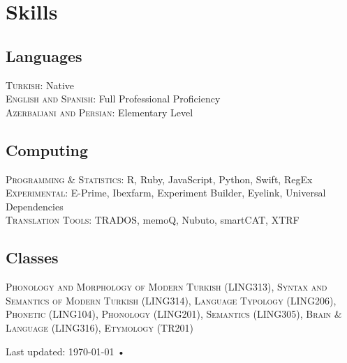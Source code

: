 \documentclass[11.5pt, a4paper]{article}
\begin{document}
\section*{\faWrench \thinspace Skills}

\subsection*{Languages}
\textsc{Turkish}: Native \\
\textsc{English and Spanish}: Full Professional Proficiency \\
\textsc{Azerbaijani and Persian}: Elementary Level \\

\subsection*{Computing}
\textsc{Programming \& Statistics}: R, Ruby, JavaScript, Python, Swift, RegEx \\
\textsc{Experimental}: E-Prime, Ibexfarm, Experiment Builder, Eyelink, Universal Dependencies \\
\textsc{Translation Tools}: TRADOS, memoQ, Nubuto, smartCAT, XTRF

\subsection*{Classes}
\textsc{Phonology and Morphology of Modern Turkish (LING313), Syntax and Semantics of Modern Turkish (LING314), Language Typology (LING206), Phonetic (LING104), Phonology (LING201), Semantics (LING305), Brain & Language (LING316), Etymology (TR201) }




\vfill{}

\begin{center}
{\scriptsize  Last updated: \today\- •\- }
\end{center}
\end{document}
